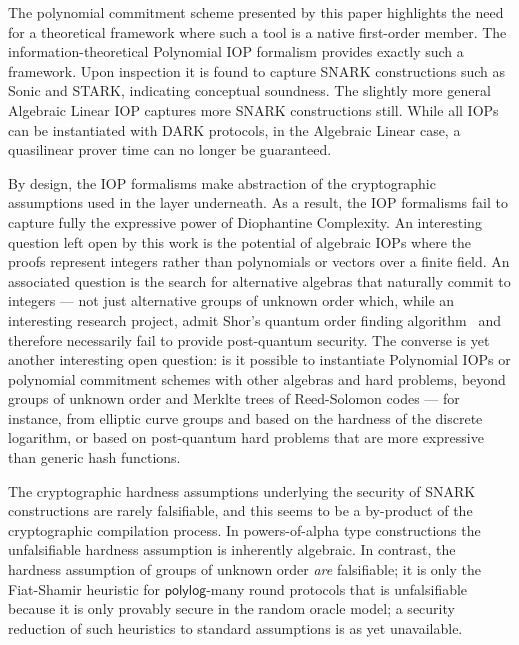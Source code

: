 \documentclass{article}
\theoremstyle{definition}
\begin{document}
The polynomial commitment scheme presented by this paper highlights the need for a theoretical framework where such a tool is a native first-order member.  The information-theoretical Polynomial IOP formalism provides exactly such a framework. Upon inspection it is found to capture SNARK constructions such as Sonic and STARK, indicating conceptual soundness. The slightly more general Algebraic Linear IOP captures more SNARK constructions still. While all IOPs can be instantiated with DARK protocols, in the Algebraic Linear case, a quasilinear prover time can no longer be guaranteed. 

By design, the IOP formalisms make abstraction of the cryptographic assumptions used in the layer underneath. As a result, the IOP formalisms fail to capture fully the expressive power of Diophantine Complexity. An interesting question left open by this work is the potential of algebraic IOPs where the proofs represent integers rather than polynomials or vectors over a finite field. An associated question is the search for alternative algebras that naturally commit to integers --- not just alternative groups of unknown order which, while an interesting research project, admit Shor's quantum order finding algorithm~\cite{conf/focs/Shor94} and therefore necessarily fail to provide post-quantum security. The converse is yet another interesting open question: is it possible to instantiate Polynomial IOPs or polynomial commitment schemes with other algebras and hard problems, beyond groups of unknown order and Merklte trees of Reed-Solomon codes --- for instance, from elliptic curve groups and based on the hardness of the discrete logarithm, or based on post-quantum hard problems that are more expressive than generic hash functions.

The cryptographic hardness assumptions underlying the security of SNARK constructions are rarely falsifiable, and this seems to be a by-product of the cryptographic compilation process. In powers-of-alpha type constructions the unfalsifiable hardness assumption is inherently algebraic. In contrast, the hardness assumption of groups of unknown order \emph{are} falsifiable; it is only the Fiat-Shamir heuristic for $\mathsf{polylog}$-many round protocols that is unfalsifiable because it is only provably secure in the random oracle model; a security reduction of such heuristics to standard assumptions is as yet unavailable.

 
\end{document}

